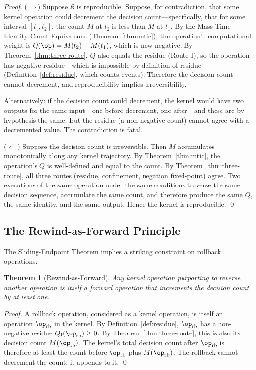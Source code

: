 \documentclass[twocolumn,11pt,a4paper]{article}
\newtheorem{theorem}{Theorem}[section]
\newcommand{\Kernel}{\mathfrak{K}}
\newcommand{\Mcount}{M}
\newcommand{\Qweight}{Q}
\begin{document}
\begin{proof}
($\Rightarrow$) Suppose $\Kernel$ is reproducible. Suppose, for contradiction, that some kernel operation could decrement the decision count---specifically, that for some interval $[t_1, t_2]$, the count $\Mcount$ at $t_2$ is less than $\Mcount$ at $t_1$. By the Mass-Time-Identity-Count Equivalence (Theorem~\ref{thm:mtic}), the operation's computational weight is $\Qweight(\op) = \Mcount(t_2) - \Mcount(t_1)$, which is now negative. By Theorem~\ref{thm:three-route}, $\Qweight$ also equals the residue (Route I), so the operation has negative residue---which is impossible by definition of residue (Definition~\ref{def:residue}, which counts events). Therefore the decision count cannot decrement, and reproducibility implies irreversibility.

Alternatively: if the decision count could decrement, the kernel would have two outputs for the same input---one before decrement, one after---and these are by hypothesis the same. But the residue (a non-negative count) cannot agree with a decremented value. The contradiction is fatal.

($\Leftarrow$) Suppose the decision count is irreversible. Then $\Mcount$ accumulates monotonically along any kernel trajectory. By Theorem~\ref{thm:mtic}, the operation's $\Qweight$ is well-defined and equal to the count. By Theorem~\ref{thm:three-route}, all three routes (residue, confinement, negation fixed-point) agree. Two executions of the same operation under the same conditions traverse the same decision sequence, accumulate the same count, and therefore produce the same $\Qweight$, the same identity, and the same output. Hence the kernel is reproducible. \qed
\end{proof}

\subsection{The Rewind-as-Forward Principle}

The Sliding-Endpoint Theorem implies a striking constraint on rollback operations.

\begin{theorem}[Rewind-as-Forward]
\label{thm:rewind}
Any kernel operation purporting to reverse another operation is itself a forward operation that increments the decision count by at least one.
\end{theorem}

\begin{proof}
A rollback operation, considered as a kernel operation, is itself an operation $\op_\mathrm{rb}$ in the kernel. By Definition~\ref{def:residue}, $\op_\mathrm{rb}$ has a non-negative residue $\Qweight_\mathrm{I}(\op_\mathrm{rb}) \geq 0$. By Theorem~\ref{thm:three-route}, this is also its decision count $\Mcount(\op_\mathrm{rb})$. The kernel's total decision count after $\op_\mathrm{rb}$ is therefore at least the count before $\op_\mathrm{rb}$ plus $\Mcount(\op_\mathrm{rb})$. The rollback cannot decrement the count; it appends to it. \qed
\end{proof}
\end{document}
